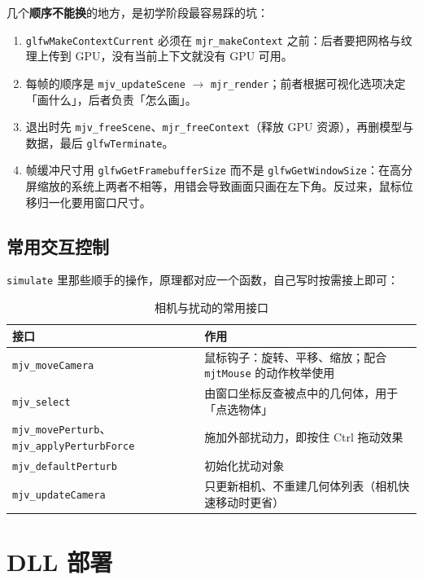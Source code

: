 几个\textbf{顺序不能换}的地方，是初学阶段最容易踩的坑：

\begin{enumerate}
	\item \texttt{glfwMakeContextCurrent} 必须在 \texttt{mjr\_makeContext} 之前：后者要把网格与纹理上传到 GPU，没有当前上下文就没有 GPU 可用。
	\item 每帧的顺序是 \texttt{mjv\_updateScene} $\rightarrow$ \texttt{mjr\_render}；前者根据可视化选项决定「画什么」，后者负责「怎么画」。
	\item 退出时先 \texttt{mjv\_freeScene}、\texttt{mjr\_freeContext}（释放 GPU 资源），再删模型与数据，最后 \texttt{glfwTerminate}。
	\item 帧缓冲尺寸用 \texttt{glfwGetFramebufferSize} 而不是 \texttt{glfwGetWindowSize}：在高分屏缩放的系统上两者不相等，用错会导致画面只画在左下角。反过来，鼠标位移归一化要用窗口尺寸。
\end{enumerate}

\subsection{常用交互控制}

\texttt{simulate} 里那些顺手的操作，原理都对应一个函数，自己写时按需接上即可：

\begin{table}[H]
	\centering
	\caption{相机与扰动的常用接口}
	\label{tab:Cpp:交互}
	\footnotesize
	\begin{tabular}{>{\raggedright\arraybackslash}p{4.4cm}>{\raggedright\arraybackslash}p{9.8cm}}
		\hline
		接口 & 作用 \\
		\hline
		\texttt{mjv\_moveCamera} & 鼠标钩子：旋转、平移、缩放；配合 \texttt{mjtMouse} 的动作枚举使用 \\
		\texttt{mjv\_select} & 由窗口坐标反查被点中的几何体，用于「点选物体」 \\
		\texttt{mjv\_movePerturb}、\texttt{mjv\_applyPerturbForce} & 施加外部扰动力，即按住 Ctrl 拖动效果 \\
		\texttt{mjv\_defaultPerturb} & 初始化扰动对象 \\
		\texttt{mjv\_updateCamera} & 只更新相机、不重建几何体列表（相机快速移动时更省） \\
		\hline
	\end{tabular}
\end{table}

\section{DLL 部署}

